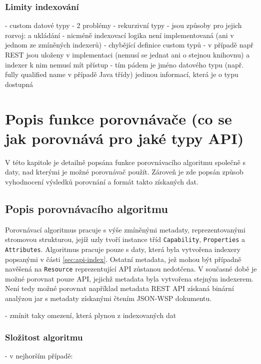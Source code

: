 \documentclass[czech,DP]{thesiskiv}
\begin{document}
\subsection{Limity indexování}

 - custom datové typy
 - 2 problémy
	- rekurzivní typy
		- jsou způsoby pro jejich rozvoj: \cite{abadi1995subytping} a ukládání
		- nicméně indexovací logika není implementovaná (ani v jednom ze zmíněných indexerů)
	- chybějící definice custom typů
		- v případě např REST jsou uloženy v implementaci (nemusí se jednat ani o stejnou knihovnu) a indexer k nim nemusí mít přístup
		- tím pádem je jméno datového typu (např. fully qualified name v případě Java třídy) jedinou informací, která je o typu dostupná

\chapter{Popis funkce porovnávače (co se jak porovnává pro jaké typy API)}

V této kapitole je detailně popsána funkce porovnávacího algoritmu společně s daty, nad kterými je možné porovnávač použít. Zároveň je zde popsán způsob vyhodnocení výsledků porovnání a formát takto získaných dat.

\section{Popis porovnávacího algoritmu}

Porovnávací algoritmus pracuje s výše zmíněnými metadaty, reprezentovanými stromovou strukturou, jejíž uzly tvoří instance tříd \verb|Capability|, \verb|Properties| a \verb|Attributes|. Algoritmus pracuje pouze s daty, která byla vytvořena indexery popsanými v části \ref{sec:api-index}. Ostatní metadata, jež mohou být případně navěšená na \verb|Resource| reprezentující API zůstanou nedotčena. V současné době je možné porovnat pouze API, jejichž metadata byla vytvořena stejným indexerem. Není tedy možné porovnat například metadata REST API získaná binární analýzou jar s metadaty získanými čtením JSON-WSP dokumentu.

- zmínit taky omezení, která plynou z indexovaných dat

\subsection{Složitost algoritmu}

- v nejhorším případě:
\end{document}
